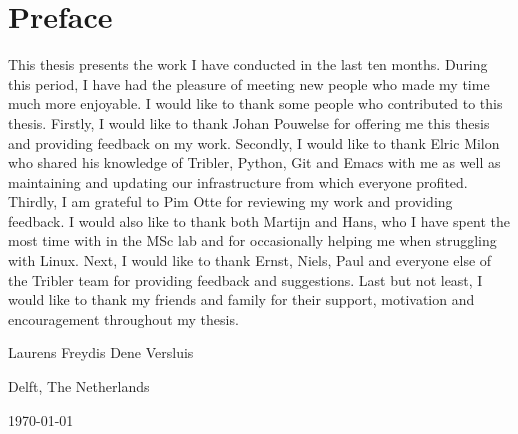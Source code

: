 \chapter*{Preface}
This thesis presents the work I have conducted in the last ten months.
During this period, I have had the pleasure of meeting new people who made my time much more enjoyable.
I would like to thank some people who contributed to this thesis.
Firstly, I would like to thank Johan Pouwelse for offering me this thesis and providing feedback on my work.
Secondly, I would like to thank Elric Milon who shared his knowledge of Tribler, Python, Git and Emacs with me as well as maintaining and updating our infrastructure from which everyone profited.
Thirdly, I am grateful to Pim Otte for reviewing my work and providing feedback.
I would also like to thank both Martijn and Hans, who I have spent the most time with in the MSc lab and for occasionally helping me when struggling with Linux.
Next, I would like to thank Ernst, Niels, Paul and everyone else of the Tribler team for providing feedback and suggestions.
Last but not least, I would like to thank my friends and family for their support, motivation and encouragement throughout my thesis.

\vspace{1\baselineskip}

\noindent
Laurens Freydis Dene Versluis

\vspace{1\baselineskip}

\noindent
Delft, The Netherlands

\noindent
\today